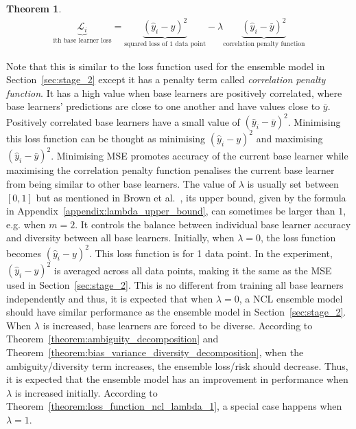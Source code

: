 \documentclass{article}
\newtheorem{theorem}{Theorem}
\begin{document}
\begin{theorem}\label{theorem:loss_function_ncl}
    \begin{align*}
        \underbrace{\mathcal{L}_i}_{\text{ith base learner loss}} = \underbrace{(\hat{y}_i - y)^2}_{\text{squared loss of 1 data point}} - \lambda \underbrace{(\hat{y}_i - \bar{y})^2}_{\text{correlation penalty function}}
    \end{align*}
\end{theorem}
Note that this is similar to the loss function used for the ensemble model in Section~\ref{sec:stage_2} except it has a penalty term called \textit{correlation penalty function}. It has a high value when base learners are positively correlated, where base learners' predictions are close to one another and have values close to $\bar{y}$. Positively correlated base learners have a small value of $(\hat{y}_i - \bar{y})^2$. Minimising this loss function can be thought as minimising $(\hat{y}_i - y)^2$ and maximising $(\hat{y}_i - \bar{y})^2$. Minimising MSE promotes accuracy of the current base learner while maximising the correlation penalty function penalises the current base learner from being similar to other base learners. The value of $\lambda$ is usually set between $[0, 1]$ but as mentioned in Brown et al.\ \cite{brown2005managing}, its upper bound, given by the formula in Appendix~\ref{appendix:lambda_upper_bound}, can sometimes be larger than $1$, e.g. when $m = 2$. It controls the balance between individual base learner accuracy and diversity between all base learners. Initially, when $\lambda = 0$, the loss function becomes $(\hat{y}_i - y)^2$. This loss function is for 1 data point. In the experiment, $(\hat{y}_i - y)^2$ is averaged across all data points, making it the same as the MSE used in Section~\ref{sec:stage_2}. This is no different from training all base learners independently and thus, it is expected that when $\lambda = 0$, a NCL ensemble model should have similar performance as the ensemble model in Section~\ref{sec:stage_2}. When $\lambda$ is increased, base learners are forced to be diverse. According to Theorem~\ref{theorem:ambiguity_decomposition} and Theorem~\ref{theorem:bias_variance_diversity_decomposition}, when the ambiguity/diversity term increases, the ensemble loss/risk should decrease. Thus, it is expected that the ensemble model has an improvement in performance when $\lambda$ is increased initially. According to Theorem~\ref{theorem:loss_function_ncl_lambda_1}, a special case happens when $\lambda = 1$. 
\end{document}
